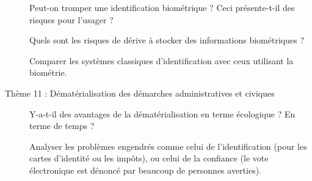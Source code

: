 \begin{description}
	Peut-on tromper une identification biométrique ? Ceci présente-t-il des risques pour l'usager ?
	
	Quels sont les risques de dérive à stocker des informations biométriques ?
	
	Comparer les systèmes classiques d'identification avec ceux utilisant la biométrie.
	
	
	\item[Thème 11 : Dématérialisation des démarches administratives et civiques]
	
	Y-a-t-il des avantages de la dématérialisation en terme écologique ? En terme de temps ?
	
	Analyser les problèmes engendrés comme celui de l'identification (pour les cartes d'identité ou les impôts), ou celui de la confiance (le vote électronique est dénoncé par beaucoup de personnes averties).
\end{description}
